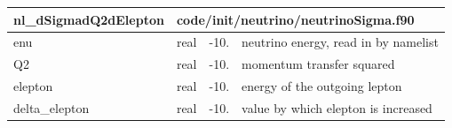 \documentclass{article}
\begin{document}
\begin{longtable}{llll}
\toprule
\textbf{\large{nl\_dSigmadQ2dElepton}} & \multicolumn{3}{l}{\footnotesize{code/init/neutrino/neutrinoSigma.f90}}\\*
\midrule
\endfirsthead
\midrule
\endhead
enu & \begin{minipage}[t]{2cm}real\end{minipage} & \begin{minipage}[t]{2cm}-10.\end{minipage} & \begin{minipage}[t]{12cm}neutrino energy, read in by namelist\end{minipage}\\*
\midrule
Q2 & \begin{minipage}[t]{2cm}real\end{minipage} & \begin{minipage}[t]{2cm}-10.\end{minipage} & \begin{minipage}[t]{12cm}momentum transfer squared\end{minipage}\\*
\midrule
elepton & \begin{minipage}[t]{2cm}real\end{minipage} & \begin{minipage}[t]{2cm}-10.\end{minipage} & \begin{minipage}[t]{12cm}energy of the outgoing lepton\end{minipage}\\*
\midrule
delta\_elepton & \begin{minipage}[t]{2cm}real\end{minipage} & \begin{minipage}[t]{2cm}-10.\end{minipage} & \begin{minipage}[t]{12cm}value by which elepton is increased\end{minipage}\\*
\bottomrule
\end{longtable}
{ }



\end{document}
